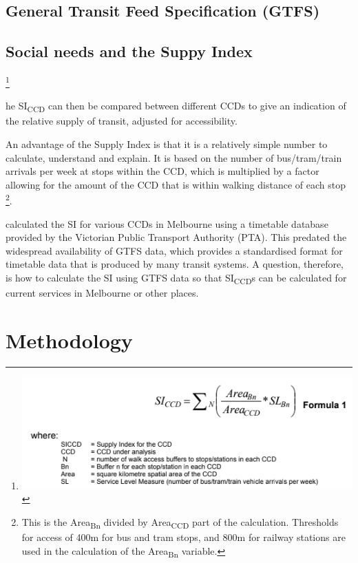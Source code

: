 \documentclass[numbered]{trbunofficial}
\begin{document}
\hypertarget{general-transit-feed-specification-gtfs}{%
\subsection{General Transit Feed Specification
(GTFS)}\label{general-transit-feed-specification-gtfs}}

\hypertarget{social-needs-and-the-suppy-index}{%
\subsection{Social needs and the Suppy
Index}\label{social-needs-and-the-suppy-index}}

\footnote{\includegraphics{Supply_index.png}}

he SI\textsubscript{CCD} can then be compared between different CCDs to
give an indication of the relative supply of transit, adjusted for
accessibility.

An advantage of the Supply Index is that it is a relatively simple
number to calculate, understand and explain. It is based on the number
of bus/tram/train arrivals per week at stops within the CCD, which is
multiplied by a factor allowing for the amount of the CCD that is within
walking distance of each stop \footnote{This is the
  Area\textsubscript{Bn} divided by Area\textsubscript{CCD} part of the
  calculation. Thresholds for access of 400m for bus and tram stops, and
  800m for railway stations are used in the calculation of the
  Area\textsubscript{Bn} variable.}.

\citet{currie2007identifying} calculated the SI for various CCDs in
Melbourne using a timetable database provided by the Victorian Public
Transport Authority (PTA). This predated the widespread availability of
GTFS data, which provides a standardised format for timetable data that
is produced by many transit systems. A question, therefore, is how to
calculate the SI using GTFS data so that SI\textsubscript{CCD}s can be
calculated for current services in Melbourne or other places.

\hypertarget{methodology}{%
\section{Methodology}\label{methodology}}
\end{document}
